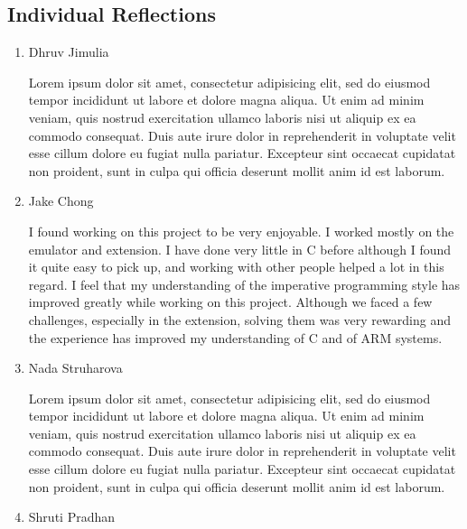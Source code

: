 \documentclass[11pt, letterpaper]{article}
\begin{document}
\subsection{Individual Reflections}

\begin{enumerate}

\item Dhruv Jimulia

Lorem ipsum dolor sit amet, consectetur adipisicing elit, sed do eiusmod tempor
incididunt ut labore et dolore magna aliqua. Ut enim ad minim veniam, quis
nostrud exercitation ullamco laboris nisi ut aliquip ex ea commodo consequat.
Duis aute irure dolor in reprehenderit in voluptate velit esse cillum dolore eu
fugiat nulla pariatur. Excepteur sint occaecat cupidatat non proident, sunt in
culpa qui officia deserunt mollit anim id est laborum.

\item Jake Chong

I found working on this project to be very enjoyable. I worked mostly on the emulator and extension. I have done very little in C before although I found it quite easy to pick up, and working with other people helped a lot in this regard. I feel that my understanding of the imperative programming style has improved greatly while working on this project. Although we faced a few challenges, especially in the extension, solving them was very rewarding and the experience has improved my understanding of C and of ARM systems.  

\item Nada Struharova

Lorem ipsum dolor sit amet, consectetur adipisicing elit, sed do eiusmod tempor
incididunt ut labore et dolore magna aliqua. Ut enim ad minim veniam, quis
nostrud exercitation ullamco laboris nisi ut aliquip ex ea commodo consequat.
Duis aute irure dolor in reprehenderit in voluptate velit esse cillum dolore eu
fugiat nulla pariatur. Excepteur sint occaecat cupidatat non proident, sunt in
culpa qui officia deserunt mollit anim id est laborum.

\item Shruti Pradhan


\end{enumerate}
\end{document}
